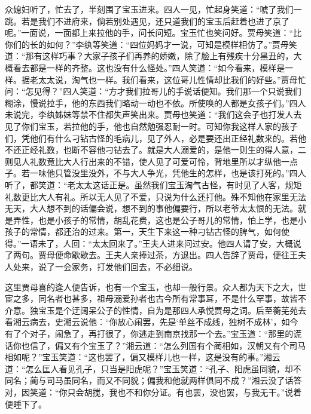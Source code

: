 众媳妇听了，忙去了，半刻围了宝玉进来。四人一见，忙起身笑道：``唬了我们一跳。若是我们不进府来，倘若别处遇见，还只道我们的宝玉后赶着也进了京了呢。''一面说，一面都上来拉他的手，问长问短。宝玉忙也笑问好。贾母笑道：``比你们的长的如何？''李纨等笑道：``四位妈妈才一说，可知是模样相仿了。''贾母笑道：``那有这样巧事？大家子孩子们再养的娇嫩，除了脸上有残疾十分黑丑的，大概看去都是一样的齐整。这也没有什么怪处。''四人笑道：``如今看来，模样是一样。据老太太说，淘气也一样。我们看来，这位哥儿性情却比我们的好些。''贾母忙问：``怎见得？''四人笑道：``方才我们拉哥儿的手说话便知。我们那一个只说我们糊涂，慢说拉手，他的东西我们略动一动也不依。所使唤的人都是女孩子们。''四人未说完，李纨姊妹等禁不住都失声笑出来。贾母也笑道：``我们这会子也打发人去见了你们宝玉，若拉他的手，他也自然勉强忍耐一时。可知你我这样人家的孩子们，凭他们有什么刁钻古怪的毛病儿，见了外人，必是要还出正经礼数来的。若他不还正经礼数，也断不容他刁钻去了。就是大人溺爱的，是他一则生的得人意，二则见人礼数竟比大人行出来的不错，使人见了可爱可怜，背地里所以才纵他一点子。若一味他只管没里没外，不与大人争光，凭他生的怎样，也是该打死的。''四人听了，都笑道：``老太太这话正是。虽然我们宝玉淘气古怪，有时见了人客，规矩礼数更比大人有礼。所以无人见了不爱，只说为什么还打他。殊不知他在家里无法无天，大人想不到的话偏会说，想不到的事他偏要行，所以老爷太太恨的无法。就是弄性，也是小孩子的常情，胡乱花费，这也是公子哥儿的常情，怕上学，也是小孩子的常情，都还治的过来。第一，天生下来这一种刁钻古怪的脾气，如何使得。''一语未了，人回：``太太回来了。''王夫人进来问过安。他四人请了安，大概说了两句。贾母便命歇歇去。王夫人亲捧过茶，方退出。四人告辞了贾母，便往王夫人处来，说了一会家务，打发他们回去，不必细说。

这里贾母喜的逢人便告诉，也有一个宝玉，也却一般行景。众人都为天下之大，世宦之多，同名者也甚多，祖母溺爱孙者也古今所有常事耳，不是什么罕事，故皆不介意。独宝玉是个迂阔呆公子的性情，自为是那四人承悦贾母之词。后至蘅芜苑去看湘云病去，史湘云说他：``你放心闹罢，先是`单丝不成线，独树不成林'，如今有了个对子，闹急了，再打很了，你逃走到南京找那一个去。''宝玉道：``那里的谎话你也信了，偏又有个宝玉了？''湘云道：``怎么列国有个蔺相如，汉朝又有个司马相如呢？''宝玉笑道：``这也罢了，偏又模样儿也一样，这是没有的事。''湘云道：``怎么匡人看见孔子，只当是阳虎呢？''宝玉笑道：``孔子、阳虎虽同貌，却不同名；蔺与司马虽同名，而又不同貌；偏我和他就两样俱同不成？''湘云没了话答对，因笑道：``你只会胡搅，我也不和你分证。有也罢，没也罢，与我无干。''说着便睡下了。

